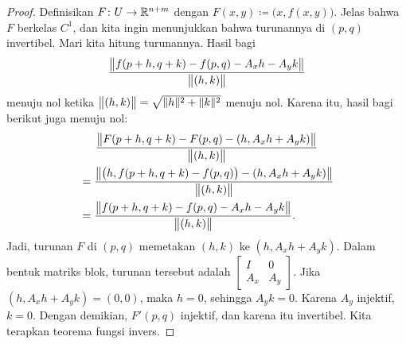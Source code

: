 \begin{proof}
Definisikan $F \colon U \to {\mathbb{R}}^{n+m}$ dengan $F(x,y) \coloneqq \bigl(x,f(x,y)\bigr)$.
Jelas bahwa $F$ berkelas $C^1$, dan kita ingin menunjukkan bahwa turunannya
di $(p,q)$ invertibel.
Mari kita hitung turunannya.  Hasil bagi
\begin{equation*}
\frac{\bigl\lVert {f(p+h,q+k) - f(p,q) - A_x h - A_y k} \bigr\rVert}{\bigl\lVert {(h,k)} \bigr\rVert}
\end{equation*}
menuju nol ketika $\bigl\lVert {(h,k)} \bigr\rVert = \sqrt{\lVert {h} \rVert^2+\lVert {k} \rVert^2}$ menuju nol.
Karena itu, hasil bagi berikut juga menuju nol:
\begin{multline*}
\frac{\bigl\lVert {F(p+h,q+k)-F(p,q) - (h,A_x h+A_y k)} \bigr\rVert}{\bigl\lVert {(h,k)} \bigr\rVert}
\\
\begin{aligned}
& =
\frac{\bigl\lVert {\bigl(h,f(p+h,q+k)-f(p,q)\bigr) - (h,A_x h+A_y
k)} \bigr\rVert}{\bigl\lVert {(h,k)} \bigr\rVert}
\\
& =
\frac{\bigl\lVert {f(p+h,q+k) - f(p,q) - A_x h - A_y k} \bigr\rVert}{\bigl\lVert {(h,k)} \bigr\rVert} .
\end{aligned}
\end{multline*}
Jadi, turunan $F$ di $(p,q)$ memetakan $(h,k)$ ke $(h,A_x h+A_y k)$.
Dalam bentuk matriks blok, turunan tersebut adalah
$\left[\begin{smallmatrix}I & 0\\A_x & A_y\end{smallmatrix}\right]$.  Jika 
$(h,A_x h+A_y k) = (0,0)$, maka $h=0$, sehingga $A_y k = 0$.  Karena $A_y$
injektif, $k=0$.  Dengan demikian, $F'(p,q)$ injektif, dan karena itu invertibel.
Kita terapkan teorema fungsi invers.


\end{proof}
